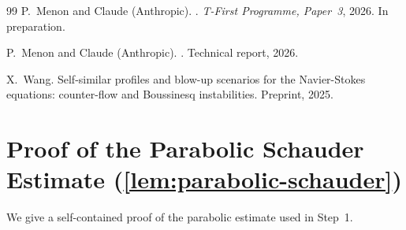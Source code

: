\documentclass[12pt]{article}
\theoremstyle{plain}
\theoremstyle{definition}
\theoremstyle{remark}
\begin{document}
\begin{thebibliography}{99}
P.\ Menon and Claude (Anthropic).
.
\newblock \textit{T-First Programme, Paper~3}, 2026.
  In preparation.

P.\ Menon and Claude (Anthropic).
.
\newblock Technical report, 2026.

X.\ Wang.
\newblock Self-similar profiles and blow-up scenarios for the {Navier-Stokes}
  equations: counter-flow and {Boussinesq} instabilities.
\newblock Preprint, 2025.

\end{thebibliography}


\appendix

\section{Proof of the Parabolic Schauder Estimate (\cref{lem:parabolic-schauder})}\label{app:parabolic}

We give a self-contained proof of the parabolic estimate used in Step~1.
\end{document}
